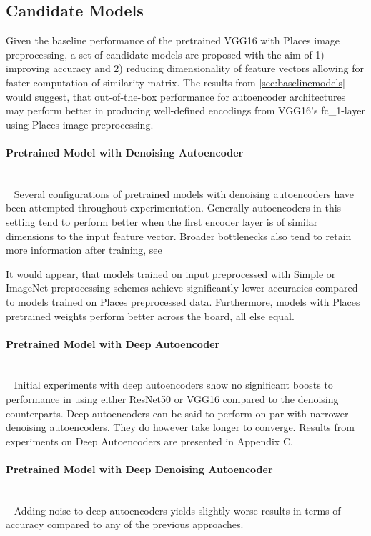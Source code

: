 \subsection{Candidate Models}
Given the baseline performance of the pretrained VGG16 with Places image preprocessing, a set of candidate models are proposed with the aim of 1) improving accuracy and 2) reducing dimensionality of feature vectors allowing for faster computation of similarity matrix.
The results from \autoref{sec:baselinemodels} would suggest, that out-of-the-box performance for autoencoder architectures may perform better in producing well-defined encodings from VGG16's fc\_1-layer using Places image preprocessing. 

\paragraph{Pretrained Model with Denoising Autoencoder} \\~
Several configurations of pretrained models with denoising autoencoders have been attempted throughout experimentation. 
Generally autoencoders in this setting tend to perform better when the first encoder layer is of similar dimensions to the input feature vector. 
Broader bottlenecks also tend to retain more information after training, see 

It would appear, that models trained on input preprocessed with Simple or ImageNet preprocessing schemes achieve significantly lower accuracies compared to models trained on Places preprocessed data. 
Furthermore, models with Places pretrained weights perform better across the board, all else equal. 


\paragraph{Pretrained Model with Deep Autoencoder} \\~
Initial experiments with deep autoencoders show no significant boosts to performance in using either ResNet50 or VGG16 compared to the denoising counterparts. 
Deep autoencoders can be said to perform on-par with narrower denoising autoencoders. They do however take longer to converge. 
Results from experiments on Deep Autoencoders are presented in Appendix C.

\paragraph{Pretrained Model with Deep Denoising Autoencoder} \\~
Adding noise to deep autoencoders yields slightly worse results in terms of accuracy compared to any of the previous approaches. 


